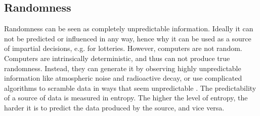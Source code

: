 \subsection{Randomness}
Randomness can be seen as completely unpredictable information. Ideally it can not be predicted or influenced in any way, hence why it can be used as a source of impartial decisions, e.g. for lotteries.
However, computers are not random. Computers are intrinsically deterministic, and thus can not produce true randomness. Instead, they can generate it by observing highly unpredictable information like atmospheric noise and radioactive decay, or use complicated algorithms to scramble data in ways that seem unpredictable \cite{randomsources}.
The predictability of a source of data is measured in entropy. The higher the level of entropy, the harder it is to predict the data produced by the source, and vice versa.
